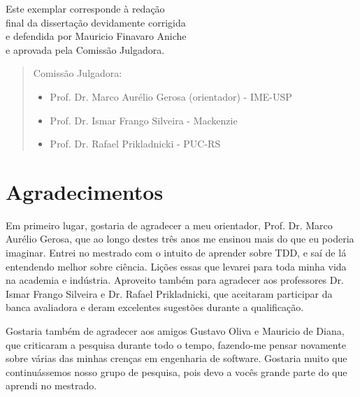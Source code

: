 \documentclass[11pt,openany,twoside,a4paper]{book}
\begin{document}
    \vskip 2cm

    \begin{flushright}
     Este exemplar corresponde à redação\\
     final da dissertação devidamente corrigida\\
     e defendida por Mauricio Finavaro Aniche\\
     e aprovada pela Comissão Julgadora.

    \vskip 2cm

    \end{flushright}
    \vskip 4.2cm

    \begin{quote}
    \noindent Comissão Julgadora:
    
    \begin{itemize}
		\item Prof. Dr. Marco Aurélio Gerosa (orientador) - IME-USP
		\item Prof. Dr. Ismar Frango Silveira - Mackenzie
		\item Prof. Dr. Rafael Prikladnicki - PUC-RS
    \end{itemize}
      
    \end{quote}
\pagebreak


\chapter*{Agradecimentos}

Em primeiro lugar, gostaria de agradecer a meu orientador, Prof. Dr. Marco Aurélio
Gerosa, que ao longo destes três anos me ensinou mais do que eu poderia imaginar.
Entrei no mestrado com o intuito de aprender sobre TDD, e saí de lá entendendo
melhor sobre ciência. Lições essas que levarei para toda minha vida na academia e indústria.
Aproveito também para agradecer aos professores Dr. Ismar Frango Silveira e Dr. Rafael
Prikladnicki, que aceitaram participar da banca avaliadora
e deram excelentes sugestões durante a qualificação.

Gostaria também de agradecer aos amigos Gustavo Oliva e Mauricio de Diana, que
criticaram a pesquisa durante todo o tempo, fazendo-me pensar novamente sobre
várias das minhas crenças em engenharia de software. Gostaria muito que continuássemos
nosso grupo de pesquisa, pois devo a vocês grande parte do que aprendi no mestrado.
\end{document}

